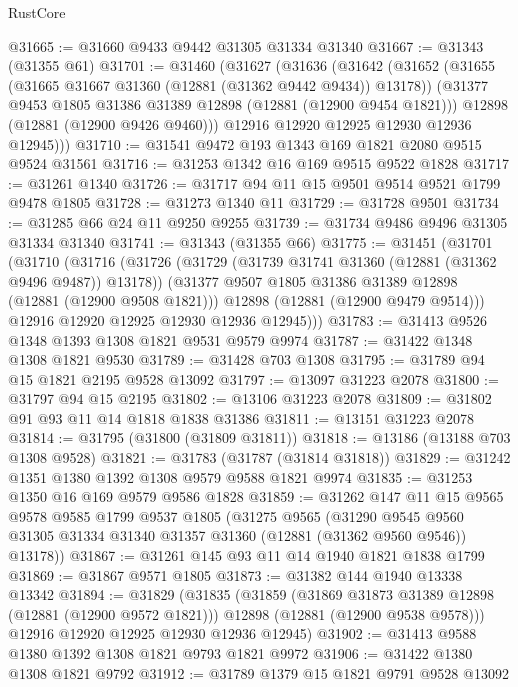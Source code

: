 \begin{lexlean}{RustCore}
\begin{coremodule}
@31665 := @31660 @9433 @9442 @31305 @31334 @31340
@31667 := @31343 (@31355 @61)
@31701 := @31460
    (@31627
      (@31636
        (@31642
          (@31652
            (@31655 (@31665 @31667 @31360 (@12881 (@31362 @9442 @9434)) @13178))
            (@31377 @9453 @1805 @31386 @31389 @12898 (@12881 (@12900 @9454 @1821)))
            @12898
            (@12881 (@12900 @9426 @9460)))
          @12916
          @12920
          @12925
          @12930
          @12936
          @12945)))
@31710 := @31541 @9472 @193 @1343 @169 @1821 @2080 @9515 @9524 @31561
@31716 := @31253 @1342 @16 @169 @9515 @9522 @1828
@31717 := @31261 @1340
@31726 := @31717 @94 @11 @15 @9501 @9514 @9521 @1799 @9478 @1805
@31728 := @31273 @1340 @11
@31729 := @31728 @9501
@31734 := @31285 @66 @24 @11 @9250 @9255
@31739 := @31734 @9486 @9496 @31305 @31334 @31340
@31741 := @31343 (@31355 @66)
@31775 := @31451
    (@31701
      (@31710
        (@31716
          (@31726
            (@31729 (@31739 @31741 @31360 (@12881 (@31362 @9496 @9487)) @13178))
            (@31377 @9507 @1805 @31386 @31389 @12898 (@12881 (@12900 @9508 @1821)))
            @12898
            (@12881 (@12900 @9479 @9514)))
          @12916
          @12920
          @12925
          @12930
          @12936
          @12945)))
@31783 := @31413 @9526 @1348 @1393 @1308 @1821 @9531 @9579 @9974
@31787 := @31422 @1348 @1308 @1821 @9530
@31789 := @31428 @703 @1308
@31795 := @31789 @94 @15 @1821 @2195 @9528 @13092
@31797 := @13097 @31223 @2078
@31800 := @31797 @94 @15 @2195
@31802 := @13106 @31223 @2078
@31809 := @31802 @91 @93 @11 @14 @1818 @1838 @31386
@31811 := @13151 @31223 @2078
@31814 := @31795 (@31800 (@31809 @31811))
@31818 := @13186 (@13188 @703 @1308 @9528)
@31821 := @31783 (@31787 (@31814 @31818))
@31829 := @31242 @1351 @1380 @1392 @1308 @9579 @9588 @1821 @9974
@31835 := @31253 @1350 @16 @169 @9579 @9586 @1828
@31859 := @31262
    @147
    @11
    @15
    @9565
    @9578
    @9585
    @1799
    @9537
    @1805
    (@31275
      @9565
      (@31290 @9545 @9560 @31305 @31334 @31340 @31357 @31360 (@12881 (@31362 @9560 @9546)) @13178))
@31867 := @31261 @145 @93 @11 @14 @1940 @1821 @1838 @1799
@31869 := @31867 @9571 @1805
@31873 := @31382 @144 @1940 @13338 @13342
@31894 := @31829
    (@31835
      (@31859
        (@31869 @31873 @31389 @12898 (@12881 (@12900 @9572 @1821)))
        @12898
        (@12881 (@12900 @9538 @9578)))
      @12916
      @12920
      @12925
      @12930
      @12936
      @12945)
@31902 := @31413 @9588 @1380 @1392 @1308 @1821 @9793 @1821 @9972
@31906 := @31422 @1380 @1308 @1821 @9792
@31912 := @31789 @1379 @15 @1821 @9791 @9528 @13092

\end{coremodule}
\end{lexlean}
